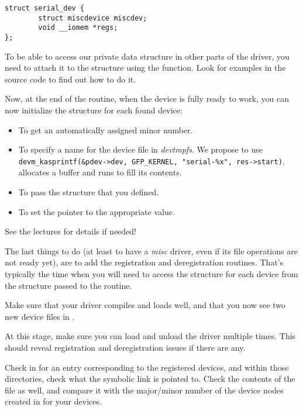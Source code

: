 \begin{verbatim}
struct serial_dev {
        struct miscdevice miscdev;
        void __iomem *regs;
};
\end{verbatim}

To be able to access our private data structure in other parts of the
driver, you need to attach it to the  structure using the
 function. Look for examples in the
source code to find out how to do it.

Now, at the end of the  routine, when the device is fully ready
to work, you can now initialize the  structure
for each found device:

\begin{itemize}
\item To get an automatically assigned minor number.
\item To specify a name for the device file in {\em devtmpfs}. We
  propose to use {\tt devm\_kasprintf(\&pdev->dev, GFP\_KERNEL,
  "serial-\%x", res->start)}.  allocates a
  buffer and runs  to fill its contents.
\item To pass the  structure that you defined.
\item To set the  pointer to the appropriate value.
\end{itemize}

See the lectures for details if needed!

The last things to do (at least to have a {\em misc} driver, even if
its file operations are not ready yet), are to add the registration and
deregistration routines. That's typically the time when you will need
to access the  structure for each device from the
 structure passed to the  routine.

Make sure that your driver compiles and loads well, and that you
now see two new device files in .

At this stage, make sure you can load and unload the driver multiple
times. This should reveal registration and deregistration issues if
there are any.

Check in  for an entry corresponding to the
registered devices, and within those directories, check what the
 symbolic link is pointed to. Check the contents of the
 file as well, and compare it with the major/minor number of
the device nodes created in  for your devices.

